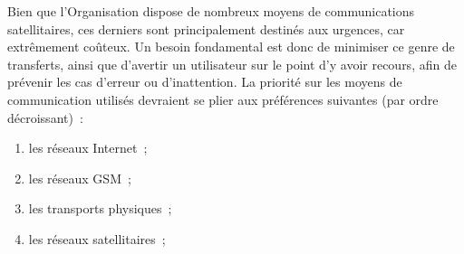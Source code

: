 \begin{constraint}
Bien que l'Organisation dispose de nombreux moyens de communications satellitaires, ces derniers sont principalement destinés aux urgences, car extrêmement coûteux. Un besoin fondamental est donc de minimiser ce genre de transferts, ainsi que d'avertir un utilisateur sur le point d'y avoir recours, afin de prévenir les cas d'erreur ou d'inattention.
La priorité sur les moyens de communication utilisés devraient se plier aux préférences suivantes (par ordre décroissant)~:
\begin{enumerate}
	\item les réseaux Internet~;
	\item les réseaux GSM~;
	\item les transports physiques~;
	\item les réseaux satellitaires~;
\end{enumerate}
\end{constraint}



